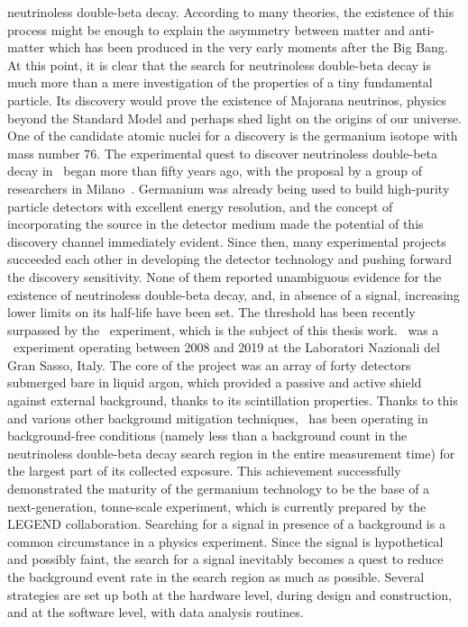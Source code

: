 neutrinoless double-beta decay. According to many theories, the existence of this process
might be enough to explain the asymmetry between matter and anti-matter which has been
produced in the very early moments after the Big Bang. At this point, it is clear that
the search for neutrinoless double-beta decay is much more than a mere investigation of
the properties of a tiny fundamental particle. Its discovery would prove the existence of
Majorana neutrinos, physics beyond the Standard Model and perhaps shed light on the
origins of our universe.
\newpar
One of the candidate atomic nuclei for a discovery is the germanium isotope with mass
number 76. The experimental quest to discover neutrinoless double-beta decay in \gesix\
began more than fifty years ago, with the proposal by a group of researchers in
Milano~\cite{Fiorini1967}.  Germanium was already being used to build high-purity particle
detectors with excellent energy resolution, and the concept of incorporating the source in
the detector medium made the potential of this discovery channel immediately evident.
Since then, many experimental projects succeeded each other in developing the detector
technology and pushing forward the discovery sensitivity. None of them reported
unambiguous evidence for the existence of neutrinoless double-beta decay, and, in absence
of a signal, increasing lower limits on its half-life have been set. The \powtenyr{26}
threshold has been recently surpassed by the \gerda\ experiment, which is the subject of
this thesis work. \gerda\ was a \gesix\ experiment operating between 2008 and 2019 at the
Laboratori Nazionali del Gran Sasso, Italy. The core of the project was an array of forty
detectors submerged bare in liquid argon, which provided a passive and active shield
against external background, thanks to its scintillation properties. Thanks to this and
various other background mitigation techniques, \gerda\ has been operating in
background-free conditions (namely less than a background count in the neutrinoless
double-beta decay search region in the entire measurement time) for the largest part of
its collected exposure. This achievement successfully demonstrated the maturity of the
germanium technology to be the base of a next-generation, tonne-scale experiment, which is
currently prepared by the LEGEND collaboration.
\newpar
Searching for a signal in presence of a background is a common circumstance in a physics
experiment. Since the signal is hypothetical and possibly faint, the search for a signal
inevitably becomes a quest to reduce the background event rate in the search region as
much as possible. Several strategies are set up both at the hardware level, during design
and construction, and at the software level, with data analysis routines.

